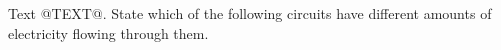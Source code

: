 Text @TEXT@. State which of the following circuits have 
different amounts of electricity flowing through them.